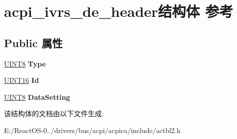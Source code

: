 \hypertarget{structacpi__ivrs__de__header}{}\section{acpi\+\_\+ivrs\+\_\+de\+\_\+header结构体 参考}
\label{structacpi__ivrs__de__header}
\subsection*{Public 属性}
\begin{DoxyCompactItemize}
\item 
\mbox{\label{structacpi__ivrs__de__header_a95bae7510aa1af872c76cebcad8758dd}} 
\hyperlink{_processor_bind_8h_ab27e9918b538ce9d8ca692479b375b6a}{U\+I\+N\+T8} {\bfseries Type}
\item 
\mbox{\label{structacpi__ivrs__de__header_ae524d7ca0f30d8bae9f98fa41d07c878}} 
\hyperlink{_processor_bind_8h_a09f1a1fb2293e33483cc8d44aefb1eb1}{U\+I\+N\+T16} {\bfseries Id}
\item 
\mbox{\label{structacpi__ivrs__de__header_afcb32a534690d54b81072f7c3dc09b03}} 
\hyperlink{_processor_bind_8h_ab27e9918b538ce9d8ca692479b375b6a}{U\+I\+N\+T8} {\bfseries Data\+Setting}
\end{DoxyCompactItemize}


该结构体的文档由以下文件生成\+:\begin{DoxyCompactItemize}
\item 
E\+:/\+React\+O\+S-\/0../drivers/bus/acpi/acpica/include/actbl2.\+h\end{DoxyCompactItemize}
